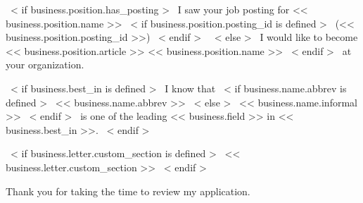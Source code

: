 ~< if business.position.has_posting >~
    I saw your job posting for << business.position.name >>
    ~< if business.position.posting_id is defined >~ (<< business.position.posting_id >>) ~< endif >~
~< else >~
    I would like to become << business.position.article >> << business.position.name >>
~< endif >~
at your organization.

~< if business.best_in is defined >~
    I know that
    ~< if business.name.abbrev is defined >~
        << business.name.abbrev >>
    ~< else >~
        << business.name.informal >>
    ~< endif >~
    is one of the leading << business.field >> in << business.best_in >>.
~< endif >~



~< if business.letter.custom_section is defined >~
  << business.letter.custom_section >>
~< endif >~

Thank you for taking the time to review my application.
